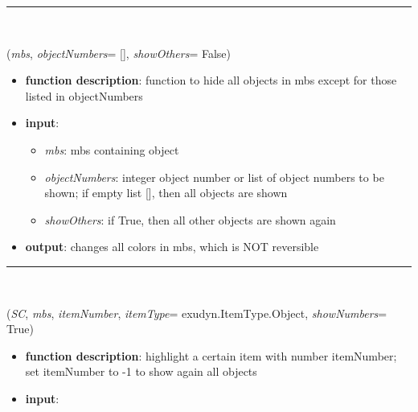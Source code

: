 \begin{itemize}[leftmargin=1.4cm]
\begin{itemize}[leftmargin=1.4cm]
\begin{itemize}[leftmargin=1.4cm]
\begin{itemize}[leftmargin=0.5cm]
%
\noindent\rule{8cm}{0.75pt}\vspace{1pt} \\ 
\begin{flushleft}
\label{sec:basicUtilities:ShowOnlyObjects}
({\it mbs}, {\it objectNumbers}= [], {\it showOthers}= False)
\end{flushleft}
\setlength{\itemindent}{0.7cm}
\begin{itemize}[leftmargin=0.7cm]
\item[--]
{\bf function description}: function to hide all objects in mbs except for those listed in objectNumbers
\item[--]
{\bf input}: \vspace{-6pt}
\begin{itemize}[leftmargin=1.2cm]
\setlength{\itemindent}{-0.7cm}
\item[]{\it mbs}: mbs containing object
\item[]{\it objectNumbers}: integer object number or list of object numbers to be shown; if empty list [], then all objects are shown
\item[]{\it showOthers}: if True, then all other objects are shown again
\end{itemize}
\item[--]
{\bf output}: changes all colors in mbs, which is NOT reversible
\vspace{12pt}\end{itemize}
%
\noindent\rule{8cm}{0.75pt}\vspace{1pt} \\ 
\begin{flushleft}
\label{sec:basicUtilities:HighlightItem}
({\it SC}, {\it mbs}, {\it itemNumber}, {\it itemType}= exudyn.ItemType.Object, {\it showNumbers}= True)
\end{flushleft}
\setlength{\itemindent}{0.7cm}
\begin{itemize}[leftmargin=0.7cm]
\item[--]
{\bf function description}: highlight a certain item with number itemNumber; set itemNumber to -1 to show again all objects
\item[--]
{\bf input}: \vspace{-6pt}
\begin{itemize}[leftmargin=1.2cm]
\setlength{\itemindent}{-0.7cm}

\end{itemize}
\end{itemize}
\end{itemize}
\end{itemize}
\end{itemize}
\end{itemize}
